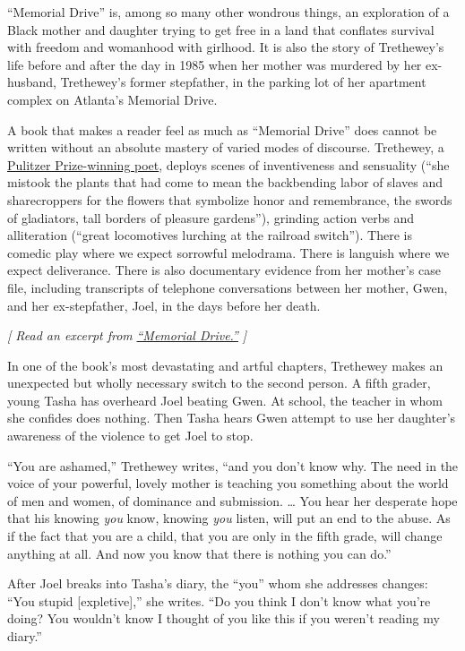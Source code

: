 ``Memorial Drive'' is, among so many other wondrous things, an
exploration of a Black mother and daughter trying to get free in a land
that conflates survival with freedom and womanhood with girlhood. It is
also the story of Trethewey's life before and after the day in 1985 when
her mother was murdered by her ex-husband, Trethewey's former
stepfather, in the parking lot of her apartment complex on Atlanta's
Memorial Drive.

A book that makes a reader feel as much as ``Memorial Drive'' does
cannot be written without an absolute mastery of varied modes of
discourse. Trethewey, a
\href{https://www.nytimes.com/2007/05/13/magazine/13wwln-Q4-t.html?searchResultPosition=5}{Pulitzer
Prize-winning poet}, deploys scenes of inventiveness and sensuality
(``she mistook the plants that had come to mean the backbending labor of
slaves and sharecroppers for the flowers that symbolize honor and
remembrance, the swords of gladiators, tall borders of pleasure
gardens''), grinding action verbs and alliteration (``great locomotives
lurching at the railroad switch''). There is comedic play where we
expect sorrowful melodrama. There is languish where we expect
deliverance. There is also documentary evidence from her mother's case
file, including transcripts of telephone conversations between her
mother, Gwen, and her ex-stepfather, Joel, in the days before her death.

\emph{{[} Read an excerpt from}
\href{https://www.nytimes.com/2020/07/30/books/review/memorial-drive-by-natasha-trethewey-an-excerpt.html}{\emph{``Memorial
Drive.''}} \emph{{]}}

In one of the book's most devastating and artful chapters, Trethewey
makes an unexpected but wholly necessary switch to the second person. A
fifth grader, young Tasha has overheard Joel beating Gwen. At school,
the teacher in whom she confides does nothing. Then Tasha hears Gwen
attempt to use her daughter's awareness of the violence to get Joel to
stop.

``You are ashamed,'' Trethewey writes, ``and you don't know why. The
need in the voice of your powerful, lovely mother is teaching you
something about the world of men and women, of dominance and submission.
\ldots{} You hear her desperate hope that his knowing \emph{you} know,
knowing \emph{you} listen, will put an end to the abuse. As if the fact
that you are a child, that you are only in the fifth grade, will change
anything at all. And now you know that there is nothing you can do.''

After Joel breaks into Tasha's diary, the ``you'' whom she addresses
changes: ``You stupid {[}expletive{]},'' she writes. ``Do you think I
don't know what you're doing? You wouldn't know I thought of you like
this if you weren't reading my diary.''

